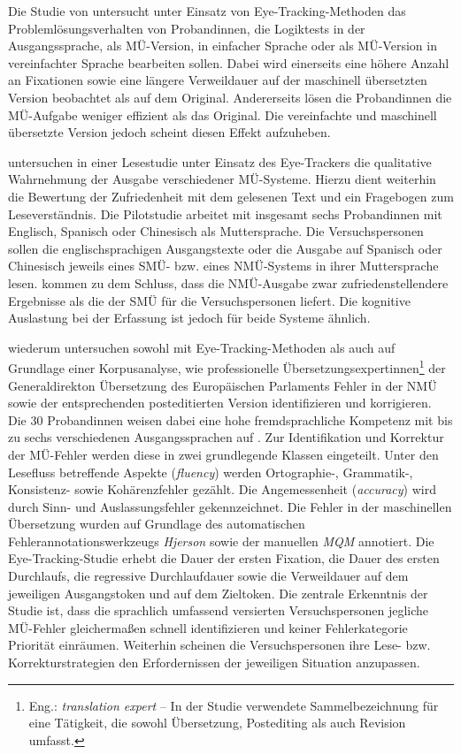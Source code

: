 Die Studie von \citet[]{klerke_reading_2015} untersucht unter Einsatz von Eye-Track\-ing-Methoden das Problemlösungsverhalten von Proband{\textperiodcentered}innen, die Logiktests in der Ausgangssprache, als MÜ-Version, in einfacher Sprache oder als MÜ-Ver\-sion in vereinfachter Sprache bearbeiten sollen. Dabei wird einerseits eine höhere Anzahl an Fixationen sowie eine längere Verweildauer auf der maschinell übersetzten Version beobachtet als auf dem Original. Andererseits lösen die Proband{\textperiodcentered}innen die MÜ-Aufgabe weniger effizient als das Original. Die vereinfachte und maschinell übersetzte Version jedoch scheint diesen Effekt aufzuheben.  

\citet[]{castilho_reading_2018} untersuchen in einer Lesestudie unter Einsatz des Eye-Trackers die qualitative Wahrnehmung der Ausgabe verschiedener MÜ-Systeme. Hierzu dient weiterhin die Bewertung der Zufriedenheit mit dem gelesenen Text und ein Fragebogen zum Leseverständnis. Die Pilotstudie arbeitet mit insgesamt sechs Proband{\textperiodcentered}innen mit Englisch, Spanisch oder Chinesisch als Muttersprache. Die Versuchspersonen sollen die englischsprachigen Ausgangstexte oder die Ausgabe auf Spanisch oder Chinesisch jeweils eines SMÜ- bzw. eines NMÜ-Systems in ihrer Muttersprache lesen. \citeauthor{castilho_reading_2018} kommen zu dem Schluss, dass die NMÜ-Ausgabe zwar zufriedenstellendere Ergebnisse als die der SMÜ für die Versuchspersonen liefert. Die kognitive Auslastung bei der Erfassung ist jedoch für beide Systeme ähnlich.

\citet[]{vardaro_translation_2019} wiederum untersuchen sowohl mit Eye-Tracking-Me\-tho\-den als auch auf Grundlage einer Korpusanalyse, wie professionelle Übersetzungsexpert{\textperiodcentered}innen\footnote{Eng.: \emph{translation expert} -- In der Studie verwendete Sammelbezeichnung für eine Tätigkeit, die sowohl Übersetzung, Postediting als auch Revision umfasst.} der Generaldirekton Übersetzung des Europäischen Parlaments Fehler in der NMÜ sowie der entsprechenden posteditierten Version identifizieren und korrigieren. Die 30 Proband{\textperiodcentered}innen weisen dabei eine hohe fremdsprachliche Kompetenz mit bis zu sechs verschiedenen Ausgangssprachen auf \citep[10]{vardaro_translation_2019}. Zur Identifikation und Korrektur der MÜ-Fehler werden diese in zwei grundlegende Klassen eingeteilt. Unter den Lesefluss betreffende Aspekte (\emph{fluency}) werden Ortographie-, Grammatik-, Konsistenz- sowie Kohärenzfehler gezählt. Die Angemessenheit (\emph{accuracy}) wird durch Sinn- und Auslassungsfehler gekennzeichnet. Die Fehler in der maschinellen Übersetzung wurden auf Grundlage des automatischen Fehlerannotationswerkzeugs \emph{Hjerson} sowie der manuellen \emph{MQM} annotiert. Die Eye-Tracking-Studie erhebt die Dauer der ersten Fixation, die Dauer des ersten Durchlaufs, die regressive Durchlaufdauer sowie die Verweildauer auf dem jeweiligen Ausgangstoken und auf dem Zieltoken. 
Die zentrale Erkenntnis der Studie ist, dass die sprachlich umfassend versierten Versuchspersonen jegliche MÜ-Fehler gleichermaßen schnell identifizieren und keiner Fehlerkategorie Priorität einräumen. Weiterhin scheinen die Versuchspersonen ihre Lese- bzw. Korrekturstrategien den Erfordernissen der jeweiligen Situation anzupassen.


